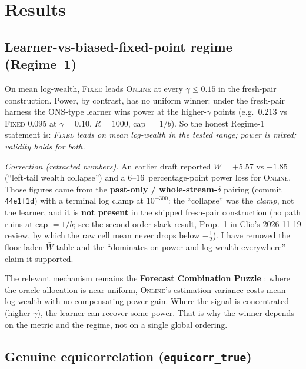\documentclass[11pt]{article}
\begin{document}
\section{Results}

\subsection{Learner-vs-biased-fixed-point regime (Regime~1)}

On mean log-wealth, \textsc{Fixed} leads \textsc{Online} at every $\gamma\le 0.15$ in
the fresh-pair construction. Power, by contrast, has no uniform winner: under the
fresh-pair harness the ONS-type learner wins power at the higher-$\gamma$ points (e.g.\
$0.213$ vs \textsc{Fixed} $0.095$ at $\gamma=0.10$, $R=1000$, cap $=1/b$). So the
honest Regime-1 statement is: \emph{\textsc{Fixed} leads on mean log-wealth in the tested
range; power is mixed; validity holds for both.}

\emph{Correction (retracted numbers).} An earlier draft reported
$\bar{W}=+5.57$ vs $+1.85$ (``left-tail wealth collapse'') and a $6$--$16$~percentage-point
power loss for \textsc{Online}. Those figures came from the \textbf{past-only /
whole-stream-$\delta$} pairing (commit \texttt{44e1f1d}) with a terminal log clamp at
$10^{-300}$: the ``collapse'' was the \emph{clamp}, not the learner, and it is \textbf{not
present} in the shipped fresh-pair construction (no path ruins at cap $=1/b$; see the
second-order slack result, Prop.~1 in Clio's 2026-11-19 review, by which the raw cell mean
never drops below $-\tfrac12$). I have removed the
floor-laden $\bar{W}$ table and the ``dominates on power and log-wealth everywhere'' claim it
supported.

The relevant mechanism remains the \textbf{Forecast Combination Puzzle}
\cite{Timmermann2006,SmithWallis2009,Claeskens2016}: where the oracle allocation is near
uniform, \textsc{Online}'s estimation variance costs mean log-wealth with no compensating
power gain. Where the signal is concentrated (higher $\gamma$), the learner can recover some
power. That is why the winner depends on the metric and the regime, not on a single global
ordering.

\subsection{Genuine equicorrelation (\texttt{equicorr\_true})}
\end{document}
